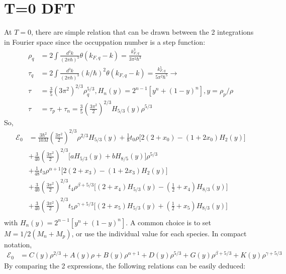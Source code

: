 \documentclass[preprint,prc,preprintnumbers,superscriptaddress,amsmath,amssymb,floatfix]{revtex4-1}
\begin{document}
\section{T=0 DFT}
At $T=0$, there are simple relation that can be drawn between the 2 integrations in Fourier space since the occuppation number is a step function:
\begin{equation}
 \begin{split}
  \rho_q &= 2\int \frac{d^3k}{(2\pi \hbar)^3} \theta(k_{F,q}-k)=\frac{k_{F,q}^3}{3 \pi^2 \hbar^3}\\
  \tau_q &=2\int \frac{d^3k}{(2\pi \hbar)^3} (k/\hbar)^2 \theta(k_{F,q}-k)=\frac{k_{F,q}^5}{5 \pi^2 \hbar^5} \rightarrow\\
  \tau &= \frac{3}{5} (3 \pi^2)^{2/3} \rho_q^{5/3}, H_n(y) = 2^{n-1}[y^n+(1-y)^n], y =\rho_p/\rho\\
  \tau &= \tau_p+\tau_n =\frac{3}{5}(\frac{3 \pi^2}{2})^{2/3} H_{5/3}(y) \rho^{5/3}
 \end{split}
\end{equation}
So,
\begin{equation}
 \begin{split}
  \mathcal{E}_{0} &=\frac{3\hbar^2}{10M}(\frac{3\pi^2}{2})^{2/3}\rho^{2/3} H_{5/3}(y)+\frac{1}{8}t_0\rho \Big[2(2+x_0)-(1+2x_0)H_2(y)\Big]\\
  &+\frac{3}{40}(\frac{3 \pi^2}{2})^{2/3}\Big[ a H_{5/3}(y) +b H_{8/5}(y) \Big]\rho^{5/3}\\
  &+\frac{1}{48}t_3\rho^{\alpha+1}\Big[2(2+x_3)-(1+2x_3)H_2(y)\Big]\\
  &+\frac{3}{40}(\frac{3 \pi^2}{2})^{2/3}t_4\rho^{\beta+5/3}\Big[ (2+x_4)H_{5/3}(y)-(\frac{1}{2}+x_4)H_{8/3}(y)\Big]\\
 &+\frac{3}{40}(\frac{3\pi^2}{2})^{2/3}t_5\rho^{\gamma+5/3}\Big[ (2+x_5)H_{5/3}(y)+(\frac{1}{2}+x_5)H_{8/3}(y) \Big]\\
 \end{split}
\end{equation}
with $H_n(y)= 2^{n-1}[y^n+(1-y)^n]$. A common choice is to set $M = 1/2(M_n+M_p)$, or use the individual value for each species.
In compact notation,
\begin{equation}
 \begin{split}
  \mathcal{E}_{0} &= C(y)\rho^{2/3}+ A(y) \rho + B(y) \rho^{\alpha+1} + D(y) \rho^{5/3} + G(y) \rho^{\beta+5/3} + K(y)\rho^{\gamma+5/3}
 \end{split}
\end{equation}
By comparing the 2 expressions, the following relations can be easily deduced:
\end{document}
